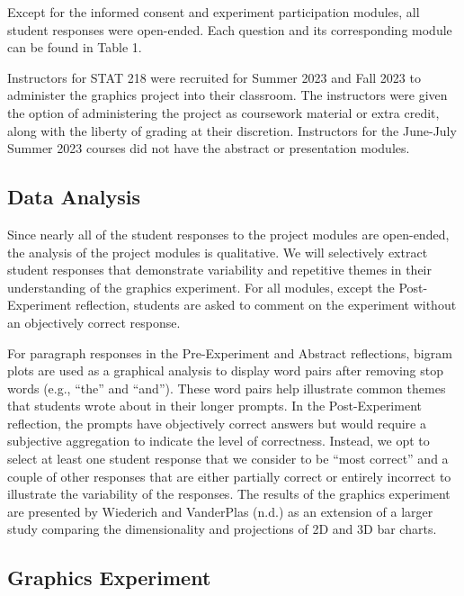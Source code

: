 \documentclass[
  12pt,
]{article}
\providecommand{\DIFdel}[1]{} %
\providecommand{\DIFadd}[1]{{\protect\color{blue} \sf #1}} %
\providecommand{\DIFdel}[1]{{\protect\color{red} [..\footnote{removed: #1} ]}} %
\providecommand{\DIFaddbegin}{} %
\providecommand{\DIFaddend}{} %
\providecommand{\DIFdelbegin}{} %
\providecommand{\DIFdelend}{} %
\newcommand{\DIFscaledelfig}{0.5}
\newlength{\DIFdelgraphicswidth} %
\newlength{\DIFdelgraphicsheight} %
\newcommand{\DIFaddincludegraphics}[2][]{{\color{blue}\fbox{\DIFOincludegraphics[#1]{#2}}}} %
\newcommand{\DIFdelincludegraphics}[2][]{%
\sbox{\DIFdelgraphicsbox}{\DIFOincludegraphics[#1]{#2}}%
\settoboxwidth{\DIFdelgraphicswidth}{\DIFdelgraphicsbox} %
\settoboxtotalheight{\DIFdelgraphicsheight}{\DIFdelgraphicsbox} %
\scalebox{\DIFscaledelfig}{%
\parbox[b]{\DIFdelgraphicswidth}{\usebox{\DIFdelgraphicsbox}\\[-\baselineskip] \rule{\DIFdelgraphicswidth}{0em}}\llap{\resizebox{\DIFdelgraphicswidth}{\DIFdelgraphicsheight}{%
\setlength{\unitlength}{\DIFdelgraphicswidth}%
\begin{picture}(1,1)%
\thicklines\linethickness{2pt} %
{\color[rgb]{1,0,0}\put(0,0){\framebox(1,1){}}}%
{\color[rgb]{1,0,0}\put(0,0){\line( 1,1){1}}}%
{\color[rgb]{1,0,0}\put(0,1){\line(1,-1){1}}}%
\end{picture}%
}\hspace*{3pt}}} %
} %
\DeclareRobustCommand{\DIFaddbegin}{\DIFOaddbegin \let\includegraphics\DIFaddincludegraphics} %
\DeclareRobustCommand{\DIFaddend}{\DIFOaddend \let\includegraphics\DIFOincludegraphics} %
\DeclareRobustCommand{\DIFdelbegin}{\DIFOdelbegin \let\includegraphics\DIFdelincludegraphics} %
\DeclareRobustCommand{\DIFdelend}{\DIFOaddend \let\includegraphics\DIFOincludegraphics} %
\begin{document}
Except for the informed consent and experiment participation modules,
all student responses were open-ended. Each question and its
corresponding module can be found in Table 1.

Instructors for STAT 218 were recruited for Summer 2023 and Fall 2023 to
administer the graphics project into their classroom. The instructors
were given the option of administering the project as coursework
material or extra credit, along with the liberty of grading at their
\DIFdelbegin \DIFdel{own
discretion. }\DIFdelend \DIFaddbegin \DIFadd{discretion. Instructors for the June-July Summer 2023 courses did not
have the abstract or presentation modules.
}\DIFaddend 

\DIFaddbegin \subsection{\DIFadd{Data Analysis}}\label{data-analysis}

\DIFadd{Since nearly all of the student responses to the project modules are
open-ended, the analysis of the project modules is qualitative. We will
selectively extract student responses that demonstrate variability and
repetitive themes in their understanding of the graphics experiment. For
all modules, except the Post-Experiment reflection, students are asked
to comment on the experiment without an objectively correct response.
}

\DIFadd{For paragraph responses in the Pre-Experiment and Abstract reflections,
bigram plots are used as a graphical analysis to display word pairs
after removing stop words (e.g., ``the'' and ``and''). These word pairs
help illustrate common themes that students wrote about in their longer
prompts. In the Post-Experiment reflection, the prompts have objectively
correct answers but would require a subjective aggregation to indicate
the level of correctness. Instead, we opt to select at least one student
response that we consider to be ``most correct'' and a couple of other
responses that are either partially correct or entirely incorrect to
illustrate the variability of the responses. The results of the graphics
experiment are presented by Wiederich and VanderPlas (n.d.) as an
extension of a larger study comparing the dimensionality and projections
of 2D and 3D bar charts.
}

\DIFaddend \subsection{Graphics Experiment}\label{graphics-experiment}
\end{document}
